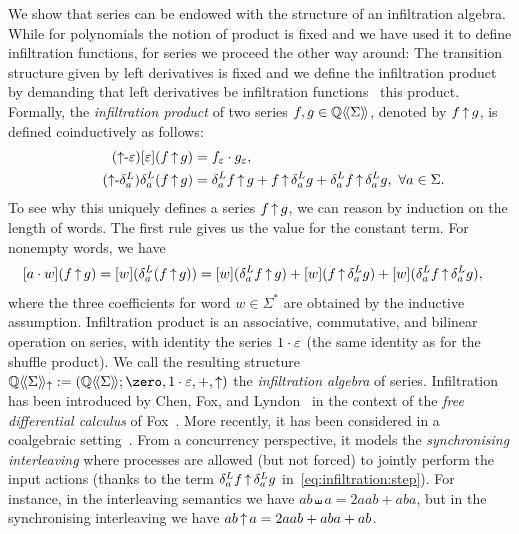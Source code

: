 We show that series can be endowed with the structure of an infiltration algebra.
While for polynomials the notion of product is fixed
and we have used it to define infiltration functions,
for series we proceed the other way around:
The transition structure given by left derivatives is fixed
and we define the infiltration product
by demanding that left derivatives be infiltration functions \wrt~this product.
%
Formally, the \emph{infiltration product} of two series $f, g \in \mathbb Q\langle\!\langle\Sigma\rangle\!\rangle$,
denoted by $f \operatorname{\uparrow} g$,
is defined coinductively as follows:
%
\begin{align}
    \tag{${\infiltration}$-$\e$}
    \label{eq:infiltration:base}
    \coefficient \e {(f \infiltration g)}
        &= f_\e \cdot g_\e, \\
    \tag{${\infiltration}$-$\deriveleft a$}
    \label{eq:infiltration:step}
        \deriveleft a (f \infiltration g)
        &= \deriveleft a f \infiltration g
            + f \infiltration \deriveleft a g
            + \deriveleft a f \infiltration \deriveleft a g,
        \ \forall a \in \Sigma.
\end{align}
%
To see why this uniquely defines a series $f \operatorname{\uparrow} g$,
we can reason by induction on the length of words.
%
The first rule gives us the value for the constant term. %
For nonempty words, we have
%
\begin{align*}
    &[a \cdot w](f \operatorname{\uparrow} g)
    = [w](\delta^L_{a} (f \operatorname{\uparrow} g))
    = [w](\delta^L_{a} f \operatorname{\uparrow} g)
    + [w](f \operatorname{\uparrow} \delta^L_{a} g)
    + [w](\delta^L_{a} f \operatorname{\uparrow} \delta^L_{a} g),
\end{align*}
%
where the three coefficients for word $w \in \Sigma^*$ are obtained by the inductive assumption.
%
%
Infiltration product is an associative, commutative, and bilinear operation on series,
with identity the series $1 \cdot \varepsilon$ (the same identity as for the shuffle product).
%
We call the resulting structure $\series \Q \Sigma_{\infiltration} := \tuple{\series \Q \Sigma; \zero, 1 \cdot \e, {+}, {\infiltration}}$
the \emph{infiltration algebra} of series.
%
%
Infiltration has been introduced by Chen, Fox, and Lyndon~\cite{ChenFoxLyndon:AM:1958}
in the context of the \emph{free differential calculus} of Fox~\cite{Fox:AM:1953}.
%
More recently, it has been considered in a coalgebraic setting~\cite[Sec.~8]{BasoldHansenPinRutten:MSCS:2017}.
%
From a concurrency perspective, it models the \emph{synchronising interleaving}
where processes are allowed (but not forced) to jointly perform the input actions
(thanks to the term $\delta^L_{a} f \operatorname{\uparrow} \delta^L_{a} g$ in~\cref{eq:infiltration:step}).
%
For instance, in the interleaving semantics we have $ab \shuffle a = 2aab + aba$,
but in the synchronising interleaving we have $ab \operatorname{\uparrow} a = 2aab + aba + ab$.

